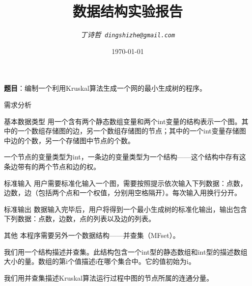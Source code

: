 \documentclass[UTF8]{ctexart}
\title{\bf 数据结构实验报告}
\author{\it 丁诗哲\ \tt{dingshizhe@gmail.com}}
\date{\today}
\begin{document}
\maketitle

\textbf{题目}：编制一个利用Kruskal算法生成一个网的最小生成树的程序。
\
\newpage

\begin{section}{需求分析}

\begin{subsection}{基本数据类型}
	用一个含有两个静态数组变量和两个int变量的结构表示一个图。其中的一个数组存储图的边，另一个数组存储图的节点；其中的一个int变量存储图中边的个数，另一个存储图中节点的个数。\\
	\par{一个节点的变量类型为int，一条边的变量类型为一个结构——这个结构中存有这条边带有的两个节点和边的权。}
\end{subsection}

\begin{subsection}{标准输入}
	用户需要标准化输入一个图，需要按照提示依次输入下列数据：点数，边数，边（包括两个点和一个权值，分别用空格隔开）。每次输入用换行分开。
\end{subsection}

\begin{subsection}{标准输出}
	数据输入完毕后，用户将得到一个最小生成树的标准化输出，输出包含下列数据：点数，边数，点的列表以及边的列表。
\end{subsection}

\begin{subsection}{其他}
	本程序需要另外一个数据结构——并查集（MFset）。
	\par{我们用一个结构描述并查集。此结构包含一个int型的静态数组和int型的描述数组大小的量。数组的第i个值描述i在哪个集合中。它的值初始为i。}
	\par{我们用并查集描述Kruskal算法运行过程中图的节点所属的连通分量。}


\end{subsection}


\end{section}
\end{document}

